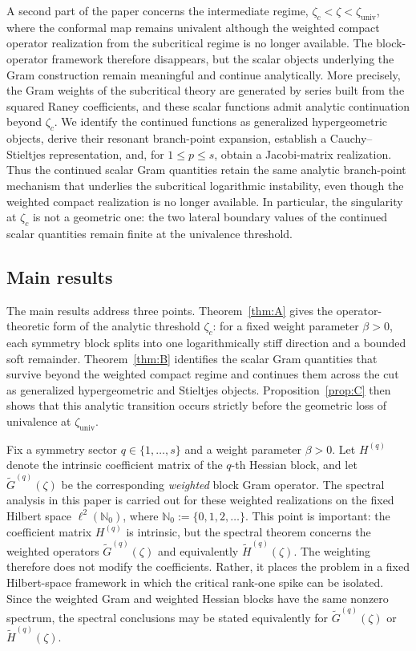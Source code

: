 \documentclass[11pt]{amsart}
\numberwithin{equation}{section}
\theoremstyle{plain}
\theoremstyle{definition}
\theoremstyle{remark}
\newcommand{\NN}{\mathbb{N}}
\begin{document}
A second part of the paper concerns the intermediate regime, $\zeta_c<\zeta<\zeta_{\mathrm{univ}}$,
where the conformal map remains
univalent although the weighted compact operator realization from the
subcritical regime is no longer available. The block-operator framework
therefore disappears, but the scalar objects underlying the Gram
construction remain meaningful and continue analytically. More precisely, the
Gram weights of the subcritical theory are generated by series built from the
squared Raney coefficients, and these scalar functions admit analytic
continuation beyond \(\zeta_c\). We identify the continued functions as
generalized hypergeometric objects, derive their resonant branch-point
expansion, establish a Cauchy--Stieltjes representation, and, for \(1\le p\le s\), obtain a Jacobi-matrix realization. Thus the continued
scalar Gram quantities retain the same analytic branch-point mechanism that
underlies the subcritical logarithmic instability, even though the weighted
compact realization is no longer available. In particular, the singularity at \(\zeta_c\) is not a geometric one: the two lateral boundary values of the
continued scalar quantities remain finite at the univalence threshold.



\subsection{Main results}
\label{subsec:main-results}

The main results address three points. Theorem~\ref{thm:A} gives the
operator-theoretic form of the analytic threshold \(\zeta_c\): for a fixed
weight parameter \(\beta>0\), each symmetry block splits into one
logarithmically stiff direction and a bounded soft remainder. Theorem~\ref{thm:B}
identifies the scalar Gram quantities that survive beyond the weighted compact
regime and continues them across the cut as generalized hypergeometric and
Stieltjes objects. Proposition~\ref{prop:C} then shows that this analytic transition
occurs strictly before the geometric loss of univalence at
\(\zeta_{\mathrm{univ}}\).

Fix a symmetry sector \(q\in\{1,\dots,s\}\) and a weight parameter
\(\beta>0\). Let \(H^{(q)}\) denote the intrinsic coefficient matrix of the
\(q\)-th Hessian block, and let \(\widetilde G^{(q)}(\zeta)\) be the
corresponding \emph{weighted} block Gram operator. The spectral analysis in this
paper is carried out for these weighted realizations on the fixed Hilbert
space \(\ell^2(\NN_0)\), where \(\NN_0:=\{0,1,2,\dots\}\). This point is
important: the coefficient matrix \(H^{(q)}\) is intrinsic, but the spectral
theorem concerns the weighted operators \(\widetilde G^{(q)}(\zeta)\) and
equivalently \(\widetilde H^{(q)}(\zeta)\). The weighting therefore does not modify the coefficients. Rather, it places the problem in a fixed Hilbert-space framework in which the critical rank-one spike can be isolated. Since the weighted Gram and weighted Hessian blocks have the same nonzero spectrum, the spectral conclusions may be stated equivalently for \(\widetilde G^{(q)}(\zeta)\) or \(\widetilde H^{(q)}(\zeta)\).
\end{document}
